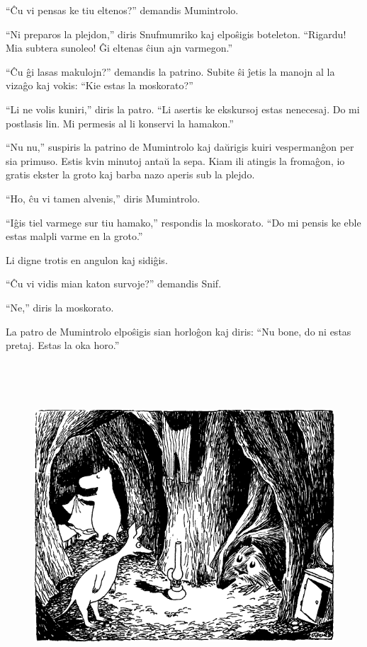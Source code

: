 ``Ĉu vi pensas ke tiu eltenos?'' demandis Mumintrolo.

``Ni preparos la plejdon,'' diris Snufmumriko kaj elpoŝigis boteleton. ``Rigardu! Mia subtera sunoleo! Ĝi eltenas ĉiun ajn varmegon.''

``Ĉu ĝi lasas makulojn?'' demandis la patrino. Subite ŝi ĵetis la manojn al la vizaĝo kaj vokis: ``Kie estas la moskorato?''

``Li ne volis kuniri,'' diris la patro. ``Li asertis ke ekskursoj estas nenecesaj. Do mi postlasis lin. Mi permesis al li konservi la hamakon.''

``Nu nu,'' suspiris la patrino de Mumintrolo kaj daŭrigis kuiri vespermanĝon per sia primuso. Estis kvin minutoj antaŭ la sepa.
\sectionbreak
Kiam ili atingis la fromaĝon, io gratis ekster la groto kaj barba nazo aperis sub la plejdo.

``Ho, ĉu vi tamen alvenis,'' diris Mumintrolo.

``Iĝis tiel varmege sur tiu hamako,'' respondis la moskorato. ``Do mi pensis ke eble estas malpli varme en la groto.''

Li digne trotis en angulon kaj sidiĝis.

``Ĉu vi vidis mian katon survoje?'' demandis Snif.

``Ne,'' diris la moskorato.

La patro de Mumintrolo elpoŝigis sian horloĝon kaj diris: ``Nu bone, do ni estas pretaj. Estas la oka horo.''

\begin{figure}[htbp]
\centering
\includegraphics[width=449pt,height=346pt]{9-6.png}
\caption{}
\label{9-6}
\end{figure}

